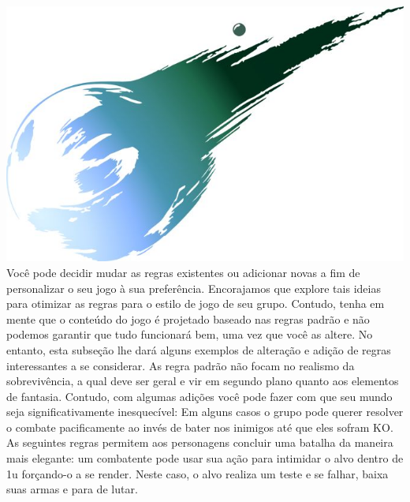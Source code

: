 %
%
\vfill
%
\includegraphics[width=\columnwidth]{./art/images/ff7.jpg}
%
\vfill
%
Você pode decidir mudar as regras existentes ou adicionar novas a fim de personalizar o seu jogo à sua preferência.
Encorajamos que explore tais ideias para otimizar as regras para o estilo de jogo de seu grupo.
Contudo, tenha em mente que o conteúdo do jogo é projetado baseado nas regras padrão e não podemos garantir que tudo funcionará bem, uma vez que você as altere.
No entanto, esta subseção lhe dará alguns exemplos de alteração e adição de regras interessantes a se considerar.
%
\vfill
%
As regra padrão não focam no realismo da sobrevivência, a qual deve ser geral e vir em segundo plano quanto aos elementos de fantasia.
Contudo, com algumas adições você pode fazer com que seu mundo seja significativamente inesquecível:\ofrow
{}
%
\vfill
%
Em alguns casos o grupo pode querer resolver o combate pacificamente ao invés de bater nos inimigos até que eles sofram KO.
As seguintes regras permitem aos personagens concluir uma batalha da maneira mais elegante: um combatente pode usar sua ação para intimidar o alvo dentro de 1u forçando-o a se render.
Neste caso, o alvo realiza um teste e se falhar, baixa suas armas e para de lutar.
